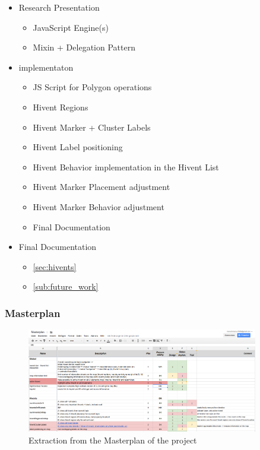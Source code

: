 \begin{itemize}
  \item Research Presentation
    \begin{itemize}
      \item JavaScript Engine(s)
      \item Mixin + Delegation Pattern
    \end{itemize}
  \item implementaton
  \begin{itemize}
     \item JS Script for Polygon operations
    \item Hivent Regions
    \item Hivent Marker + Cluster Labels
    \item Hivent Label positioning
    \item Hivent Behavior implementation in the Hivent List
    \item Hivent Marker Placement adjustment
    \item Hivent Marker Behavior adjustment
    \item Final Documentation
  \end{itemize}
  \item Final Documentation
  \begin{itemize}
    \item \ref{sec:hivents} 
    \item \ref{sub:future_work} 
  \end{itemize}
\end{itemize}


\subsubsection{Masterplan} %
\label{ssub:masterplan}

\begin{figure}[H]
  \begin{center}
    \includegraphics[width=0.9\textwidth]{graphics/Masterplan.png}
  \end{center}
  \caption{Extraction from the Masterplan of the project}
  \label{fig:masterplan}
\end{figure}

